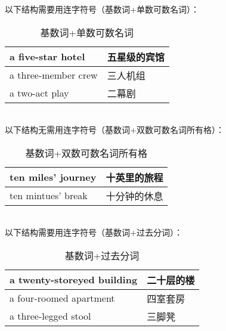 \documentclass[UTF8]{ctexart}
\begin{document}
    以下结构需要用连字符号（基数词+单数可数名词）：\vspace{5pt}
    \begin{table}[h!]
        \begin{center}
            \ttfamily
            \begin{tabular}{p{160pt}|p{80pt}}
                \hline
                a five-star hotel&五星级的宾馆\\ \hline
                a three-member crew&三人机组\\ \hline
                a two-act play&二幕剧\\ \hline
            \end{tabular}
            \rmfamily
            \caption{基数词+单数可数名词}
        \end{center}
    \end{table}\\
    以下结构无需用连字符号（基数词+双数可数名词所有格）：\vspace{5pt}
    \begin{table}[h!]
        \begin{center}
            \ttfamily
            \begin{tabular}{p{160pt}|p{80pt}}
                \hline
                ten miles' journey&十英里的旅程\\ \hline
                ten mintues' break&十分钟的休息\\ \hline
            \end{tabular}
            \rmfamily
            \caption{基数词+双数可数名词所有格}
        \end{center}
    \end{table}\\
    以下结构需要用连字符号（基数词+过去分词）：\vspace{5pt}
    \begin{table}[h!]
        \begin{center}
            \ttfamily
            \begin{tabular}{p{160pt}|p{80pt}}
                \hline
                a twenty-storeyed building&二十层的楼\\ \hline
                a four-roomed apartment&四室套房\\ \hline
                a three-legged stool&三脚凳\\ \hline
            \end{tabular}
            \rmfamily
            \caption{基数词+过去分词}
        \end{center}
    \end{table}\\
\end{document}

